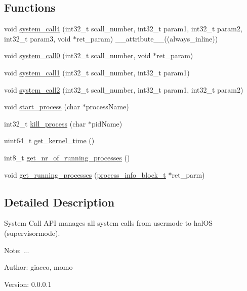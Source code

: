 \subsection*{Functions}
\begin{CompactItemize}
\item 
void \hyperlink{group___h_s_y_s_t_e_m___a_p_i_gb225a2aa0d2d8bcaa2536fa20c5a5a58}{system\_\-call4} (int32\_\-t scall\_\-number, int32\_\-t param1, int32\_\-t param2, int32\_\-t param3, void $\ast$ret\_\-param) \_\-\_\-attribute\_\-\_\-((always\_\-inline))
\item 
void \hyperlink{group___h_s_y_s_t_e_m___a_p_i_gc2a14d9e7b11a7aadcbe3e2fecb920b8}{system\_\-call0} (int32\_\-t scall\_\-number, void $\ast$ret\_\-param)
\item 
void \hyperlink{group___h_s_y_s_t_e_m___a_p_i_g9d47c8a4ca7ec749557ea6462f8c9fc8}{system\_\-call1} (int32\_\-t scall\_\-number, int32\_\-t param1)
\item 
void \hyperlink{group___h_s_y_s_t_e_m___a_p_i_g33d0bfaec0c957c63e5eecd9b2957a21}{system\_\-call2} (int32\_\-t scall\_\-number, int32\_\-t param1, int32\_\-t param2)
\item 
void \hyperlink{group___h_s_y_s_t_e_m___a_p_i_g9d888d0cd06a14252c4b3358ad2e8fdd}{start\_\-process} (char $\ast$processName)
\item 
int32\_\-t \hyperlink{group___h_s_y_s_t_e_m___a_p_i_g13bb69d9873dac8fb09bc47becdda0a4}{kill\_\-process} (char $\ast$pidName)
\item 
uint64\_\-t \hyperlink{group___h_s_y_s_t_e_m___a_p_i_gdbf1c32e05601efd0bc50077ef0b74d2}{get\_\-kernel\_\-time} ()
\item 
int8\_\-t \hyperlink{group___h_s_y_s_t_e_m___a_p_i_gc60fbbb40b86f6d30216c28a1627dd7a}{get\_\-nr\_\-of\_\-running\_\-processes} ()
\item 
void \hyperlink{group___h_s_y_s_t_e_m___a_p_i_ge906df6a1d1c0e47401b8296a8487f86}{get\_\-running\_\-processes} (\hyperlink{group___h_s_y_s_t_e_m___a_p_i_g3be61222bdb3a1adfbf7720dec596851}{process\_\-info\_\-block\_\-t} $\ast$ret\_\-parm)
\end{CompactItemize}


\subsection{Detailed Description}
System Call API manages all system calls from usermode to halOS (supervisormode). 

\begin{Desc}
\item[Note:]... \end{Desc}
\begin{Desc}
\item[Author:]giacco, momo \end{Desc}
\begin{Desc}
\item[Version:]0.0.0.1 \end{Desc}


